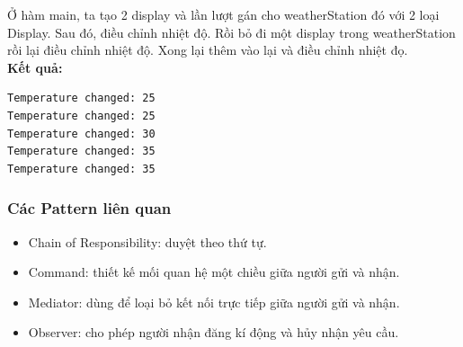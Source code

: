 Ở hàm main, ta tạo 2 display và lần lượt gán cho weatherStation đó với 2 loại Display. Sau đó, điều chỉnh nhiệt độ. Rồi bỏ đi một display trong weatherStation rồi lại điều chỉnh nhiệt độ. Xong lại thêm vào lại và điều chỉnh nhiệt đọ.\\
\newline
\textbf{Kết quả:}
\begin{lstlisting}
Temperature changed: 25
Temperature changed: 25
Temperature changed: 30
Temperature changed: 35
Temperature changed: 35
\end{lstlisting}
\subsubsection{Các Pattern liên quan}
\begin{itemize}
    \item Chain of Responsibility: duyệt theo thứ tự.
    \item Command: thiết kế mối quan hệ một chiều giữa người gửi và nhận.
    \item Mediator: dùng để loại bỏ kết nối trực tiếp giữa người gửi và nhận. 
    \item Observer: cho phép người nhận đăng kí động và hủy nhận yêu cầu.
\end{itemize}
